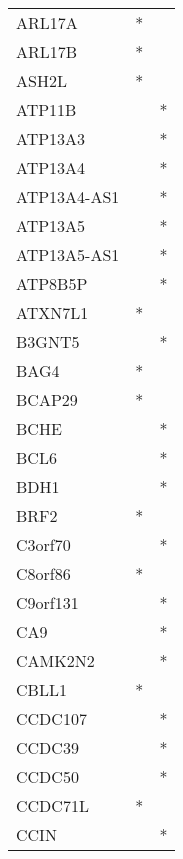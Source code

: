 \begin{longtable}{lcc}
ARL17A           &              * &            \\
ARL17B           &              * &            \\
ASH2L            &              * &            \\
ATP11B           &                &          * \\
ATP13A3          &                &          * \\
ATP13A4          &                &          * \\
ATP13A4-AS1      &                &          * \\
ATP13A5          &                &          * \\
ATP13A5-AS1      &                &          * \\
ATP8B5P          &                &          * \\
ATXN7L1          &              * &            \\
B3GNT5           &                &          * \\
BAG4             &              * &            \\
BCAP29           &              * &            \\
BCHE             &                &          * \\
BCL6             &                &          * \\
BDH1             &                &          * \\
BRF2             &              * &            \\
C3orf70          &                &          * \\
C8orf86          &              * &            \\
C9orf131         &                &          * \\
CA9              &                &          * \\
CAMK2N2          &                &          * \\
CBLL1            &              * &            \\
CCDC107          &                &          * \\
CCDC39           &                &          * \\
CCDC50           &                &          * \\
CCDC71L          &              * &            \\
CCIN             &                &          * \\

\end{longtable}

